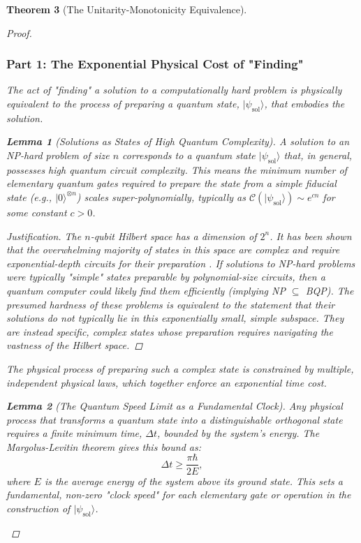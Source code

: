 \documentclass[11pt, letterpaper]{report}
\theoremstyle{plain} %
\newtheorem{theorem}{Theorem}[chapter]
\newtheorem{lemma}[theorem]{Lemma}
\theoremstyle{definition} %
\theoremstyle{remark} %
\begin{document}
\begin{theorem}[The Unitarity-Monotonicity Equivalence]
\begin{proof}
\subsubsection*{Part 1: The Exponential Physical Cost of "Finding"}

The act of "finding" a solution to a computationally hard problem is physically equivalent to the process of preparing a quantum state, $|\psi_{\text{sol}}\rangle$, that embodies the solution.

\begin{lemma}[Solutions as States of High Quantum Complexity]
A solution to an NP-hard problem of size $n$ corresponds to a quantum state $|\psi_{\text{sol}}\rangle$ that, in general, possesses high quantum circuit complexity. This means the minimum number of elementary quantum gates required to prepare the state from a simple fiducial state (e.g., $|0\rangle^{\otimes n}$) scales super-polynomially, typically as $\mathcal{C}(|\psi_{\text{sol}}\rangle) \sim e^{cn}$ for some constant $c>0$.
\end{lemma}
\begin{proof}[Justification]
The $n$-qubit Hilbert space has a dimension of $2^n$. It has been shown that the overwhelming majority of states in this space are complex and require exponential-depth circuits for their preparation \cite{NielsenChuang2010}. If solutions to NP-hard problems were typically "simple" states preparable by polynomial-size circuits, then a quantum computer could likely find them efficiently (implying NP $\subseteq$ BQP). The presumed hardness of these problems is equivalent to the statement that their solutions do not typically lie in this exponentially small, simple subspace. They are instead specific, complex states whose preparation requires navigating the vastness of the Hilbert space.
\end{proof}

The physical process of preparing such a complex state is constrained by multiple, independent physical laws, which together enforce an exponential time cost.

\begin{lemma}[The Quantum Speed Limit as a Fundamental Clock]
\label{lemma:qsl_pnp}
Any physical process that transforms a quantum state into a distinguishable orthogonal state requires a finite minimum time, $\Delta t$, bounded by the system's energy. The Margolus-Levitin theorem \cite{MargolusLevitin1998} gives this bound as:
\begin{equation}
    \Delta t \ge \frac{\pi\hbar}{2E},
\end{equation}
where $E$ is the average energy of the system above its ground state. This sets a fundamental, non-zero "clock speed" for each elementary gate or operation in the construction of $|\psi_{\text{sol}}\rangle$.
\end{lemma}


\end{proof}
\end{theorem}
\end{document}
